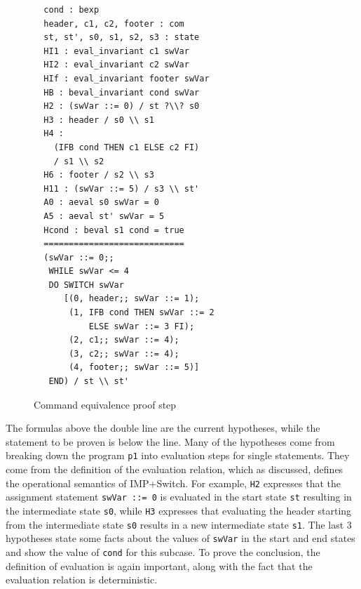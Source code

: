 \documentclass[compsoc,conference,a4paper,10pt,times]{IEEEtran}
\begin{document}
\begin{figure}
\begin{verbatim}
  cond : bexp
  header, c1, c2, footer : com
  st, st', s0, s1, s2, s3 : state
  HI1 : eval_invariant c1 swVar
  HI2 : eval_invariant c2 swVar
  HIf : eval_invariant footer swVar
  HB : beval_invariant cond swVar
  H2 : (swVar ::= 0) / st ?\\? s0
  H3 : header / s0 \\ s1
  H4 : 
    (IFB cond THEN c1 ELSE c2 FI) 
    / s1 \\ s2
  H6 : footer / s2 \\ s3
  H11 : (swVar ::= 5) / s3 \\ st'
  A0 : aeval s0 swVar = 0
  A5 : aeval st' swVar = 5
  Hcond : beval s1 cond = true
  ============================
  (swVar ::= 0;;
   WHILE swVar <= 4
   DO SWITCH swVar
      [(0, header;; swVar ::= 1);
       (1, IFB cond THEN swVar ::= 2 
           ELSE swVar ::= 3 FI);
       (2, c1;; swVar ::= 4);
       (3, c2;; swVar ::= 4);
       (4, footer;; swVar ::= 5)]
   END) / st \\ st'
\end{verbatim}
\caption{Command equivalence proof step}
    \label{comequiproof}
\end{figure}

The formulas above the double line are the current hypotheses, while the statement to be proven is below the line. Many of the hypotheses come from breaking down the program \texttt{p1} into evaluation steps for single statements. They come from the definition of the evaluation relation, which as discussed, defines the operational semantics of IMP+Switch.  For example, \texttt{H2} expresses that the assignment statement \texttt{swVar ::= 0} is evaluated in the start state \texttt{st} resulting in the intermediate state \texttt{s0}, while \texttt{H3} expresses that evaluating the header starting from the intermediate state \texttt{s0} results in a new intermediate state \texttt{s1}.  The last 3 hypotheses state some facts about the values of \texttt{swVar} in the start and end states and show the value of \texttt{cond} for this subcase. To prove the conclusion, the definition of evaluation is again important, along with the fact that the evaluation relation is deterministic.
\end{document}
